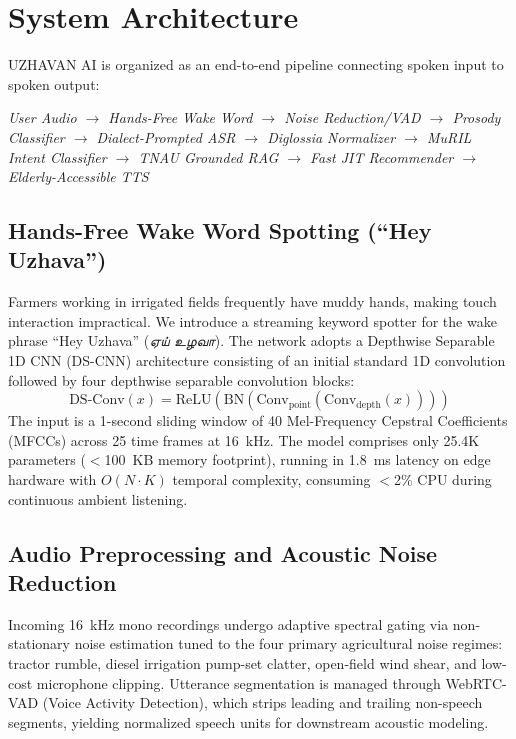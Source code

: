 \documentclass[conference]{IEEEtran}
\begin{document}
\section{System Architecture}

UZHAVAN AI is organized as an end-to-end pipeline connecting spoken input to spoken output:
\begin{center}
\textit{User Audio $\rightarrow$ Hands-Free Wake Word $\rightarrow$ Noise Reduction/VAD $\rightarrow$ Prosody Classifier $\rightarrow$ Dialect-Prompted ASR $\rightarrow$ Diglossia Normalizer $\rightarrow$ MuRIL Intent Classifier $\rightarrow$ TNAU Grounded RAG $\rightarrow$ Fast JIT Recommender $\rightarrow$ Elderly-Accessible TTS}
\end{center}

\subsection{Hands-Free Wake Word Spotting (``Hey Uzhava'')}
Farmers working in irrigated fields frequently have muddy hands, making touch interaction impractical. We introduce a streaming keyword spotter for the wake phrase ``Hey Uzhava'' (\textit{ஏய் உழவா}). The network adopts a Depthwise Separable 1D CNN (DS-CNN) architecture consisting of an initial standard 1D convolution followed by four depthwise separable convolution blocks:
\begin{equation}
\text{DS-Conv}(x) = \text{ReLU}(\text{BN}(\text{Conv}_{\text{point}}(\text{Conv}_{\text{depth}}(x))))
\end{equation}
The input is a 1-second sliding window of 40 Mel-Frequency Cepstral Coefficients (MFCCs) across 25 time frames at 16~kHz. The model comprises only 25.4K parameters ($<$100~KB memory footprint), running in 1.8~ms latency on edge hardware with $O(N \cdot K)$ temporal complexity, consuming $<$2\% CPU during continuous ambient listening.

\subsection{Audio Preprocessing and Acoustic Noise Reduction}
Incoming 16~kHz mono recordings undergo adaptive spectral gating via non-stationary noise estimation tuned to the four primary agricultural noise regimes: tractor rumble, diesel irrigation pump-set clatter, open-field wind shear, and low-cost microphone clipping. Utterance segmentation is managed through WebRTC-VAD (Voice Activity Detection), which strips leading and trailing non-speech segments, yielding normalized speech units for downstream acoustic modeling.
\end{document}
